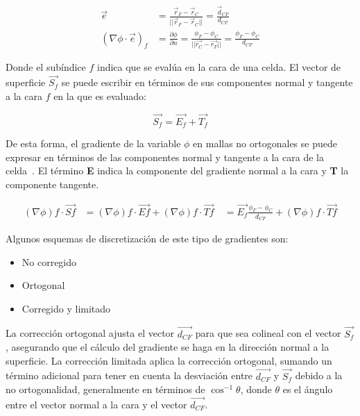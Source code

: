 \begin{align}
    \label{eq:gradiente_normal}
  \vec{e} &= \frac{\vec{r}_{F}-\vec{r}_{C}}{||\vec{r}_{F}-\vec{r}_{C}||} = \frac{\vec{d}_{CF}}{d_{CF}} \\
  (\nabla \phi \cdot \vec{e})_{f} &= \frac{\partial \phi}{\partial n} = \frac{\phi_{F} - \phi_{C}}{||\vec{r_{C}}-\vec{r_{F}}||} = \frac{\phi_{F} - \phi_{C}}{d_{CF}}
\end{align}

Donde el subíndice $f$ indica que se evalúa en la cara de una celda.
%
El vector de superficie $\vec{S_{f}}$ se puede escribir en términos de sus
componentes normal y tangente a la cara $f$ en la que es evaluado:

\begin{equation}
    \vec{S_{f}}= \vec{E_{f}} + \vec{T_{f}}
\end{equation}


De esta forma, el gradiente de la variable $\phi$ en mallas no ortogonales se
puede expresar en términos de las componentes normal y tangente a la cara de la
celda~\parencite{moukalled}.
%
El término \textbf{E} indica la componente del gradiente normal a la cara y
\textbf{T} la componente tangente.

\begin{align}
\label{eq
}
%
{(\nabla \phi)}{f}\cdot \vec{S{f}} &= {(\nabla \phi)}{f}\cdot \vec{E{f}} + {(\nabla \phi)}{f}\cdot \vec{T{f}} \
%
&= \vec{E_{f}}\frac{\phi_{F}-\phi_{C}}{d_{CF}}+ {(\nabla \phi)}{f}\cdot \vec{T{f}}
\end{align}

%
Algunos esquemas de discretización de este tipo de gradientes son:
\begin{itemize}
\item No corregido
\item Ortogonal
\item Corregido y limitado
\end{itemize}

La corrección ortogonal ajusta el vector $\vec{d_{CF}}$ para que sea colineal con el vector $\vec{S_{f}}$, asegurando que el cálculo del gradiente se haga en la dirección normal a la superficie.
%
La corrección limitada aplica la corrección ortogonal, sumando un término adicional para tener en cuenta la desviación entre $\vec{d_{CF}}$ y $\vec{S_{f}}$ debido a la no ortogonalidad, generalmente en términos de $\cos^{-1}{\theta}$, donde $\theta$ es el ángulo entre el vector normal a la cara y el vector $\vec{d_{CF}}$.

